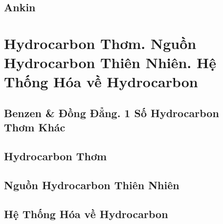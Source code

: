 \documentclass{article}
\numberwithin{equation}{section}
\begin{document}

\subsection{Ankin}


\section{Hydrocarbon Thơm. Nguồn Hydrocarbon Thiên Nhiên. Hệ Thống Hóa về Hydrocarbon}

\subsection{Benzen \& Đồng Đẳng. 1 Số Hydrocarbon Thơm Khác}


\subsection{Hydrocarbon Thơm}


\subsection{Nguồn Hydrocarbon Thiên Nhiên}


\subsection{Hệ Thống Hóa về Hydrocarbon}


\printbibliography[heading=bibintoc]
	
\end{document}
